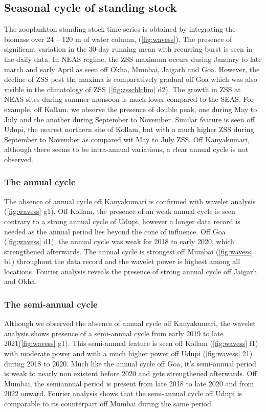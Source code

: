 \documentclass{article}
\begin{document}
	\subsection{Seasonal cycle of standing stock}
	\label{sec:seasonalcyclezss}
	The zooplankton standing stock time series is obtained by integrating the biomass over 24 -- 120 m of water column, (\cref{fig:wavess}). The presence of significant variation in the 30-day running mean with recurring burst is seen in the daily data. 
	In NEAS regime, the ZSS maximum occurs during January to late march and early April as seen off Okha, Mumbai, Jaigarh and Goa. However, the decline of ZSS post the maxima is comparatively gradual off Goa which was also visible in the climatology of ZSS (\cref{fig:zsschlclim} d2). The growth in ZSS at NEAS sites during summer monsoon is much lower compared to the SEAS. For example, off Kollam, we observe the presence of double peak, one during May to July and the another during September to November. Similar feature is seen off Udupi, the nearest northern site of Kollam, but with a much higher ZSS during September to November as compared wit May to July ZSS. Off Kanyakumari, although there seems to be intra-annual variations, a clear annual cycle is not observed.
	\subsubsection{The annual cycle}
	The absence of annual cycle off Kanyakumari is confirmed with wavelet analysis (\cref{fig:wavess} g1). Off Kollam, the presence of an weak annual cycle is seen contrary to a strong annual cycle of Udupi, however a longer data record is needed as the annual period lies beyond the cone of influence. Off Goa (\cref{fig:wavess} d1), the annual cycle was weak for 2018 to early 2020, which strengthened afterwards. The annual cycle is strongest off Mumbai (\cref{fig:wavess} b1) throughout the data record and the wavelet power is highest among all locations. Fourier analysis reveals the presence of strong annual cycle off Jaigarh and Okha.
	 
	\subsubsection{The semi-annual cycle}
	Although we observed the absence of annual cycle off Kanyakumari, the wavelet analysis shows presence of a semi-annual cycle from early 2019 to late 2021(\cref{fig:wavess} g1). This semi-annual feature is seen off Kollam (\cref{fig:wavess} f1) with moderate power and with a much higher power off Udupi (\cref{fig:wavess} 21) during 2018 to 2020. Much like the annual cycle off Goa, it's semi-annual period is weak to nearly non existent before 2020 and gets strengthened afterwards. Off Mumbai, the semiannual period is present from late 2018 to late 2020 and from 2022 onward. Fourier analysis shows that the semi-annual cycle off Udupi is comparable to its counterpart off Mumbai during the same period. 
	
\end{document}
